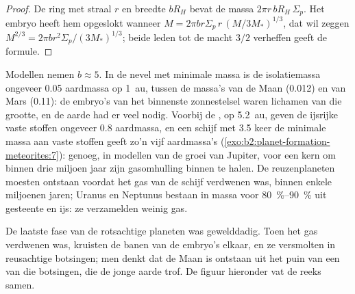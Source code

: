 \begin{proof}
De ring met straal $r$ en breedte $bR_H$ bevat de massa
$2\pi r\, bR_H\,\Sigma_p$. Het embryo heeft hem opgeslokt wanneer
$M = 2\pi b r\Sigma_p\, r\,(M/3M_*)^{1/3}$, dat wil zeggen
$M^{2/3} = 2\pi b r^2\Sigma_p/(3M_*)^{1/3}$; beide leden tot de macht
$3/2$ verheffen geeft de formule.
\end{proof}

Modellen nemen $b \approx 5$. In de nevel met minimale massa is de isolatiemassa
ongeveer \num{0.05} aardmassa op \qty{1}{au}, tussen de massa's van de
Maan (\num{0.012}) en van Mars (\num{0.11}): de embryo's van het binnenste
zonnestelsel waren lichamen van die grootte, en de aarde had er veel nodig. Voorbij de , op \qty{5.2}{au}, geven de ijsrijke vaste stoffen ongeveer
\num{0.8} aardmassa, en een schijf met \num{3.5} keer de minimale massa aan
vaste stoffen geeft zo'n vijf aardmassa's (\cref{exo:b2:planet-formation-meteorites:7}): genoeg, in modellen van de groei van
Jupiter, voor een kern om binnen drie miljoen jaar zijn gasomhulling binnen te halen. De
reuzenplaneten moesten ontstaan voordat het gas van de schijf verdwenen was, binnen enkele
miljoenen jaren; Uranus en Neptunus bestaan in massa voor \qtyrange{80}{90}{\percent} uit gesteente en ijs:
ze verzamelden weinig gas.

De laatste fase van de rotsachtige planeten was gewelddadig. Toen het gas verdwenen was, kruisten
de banen van de embryo's elkaar, en ze versmolten in reusachtige botsingen; men denkt dat de Maan
is ontstaan uit het puin van een van die botsingen, die de jonge
aarde trof. De figuur hieronder vat de reeks samen.

